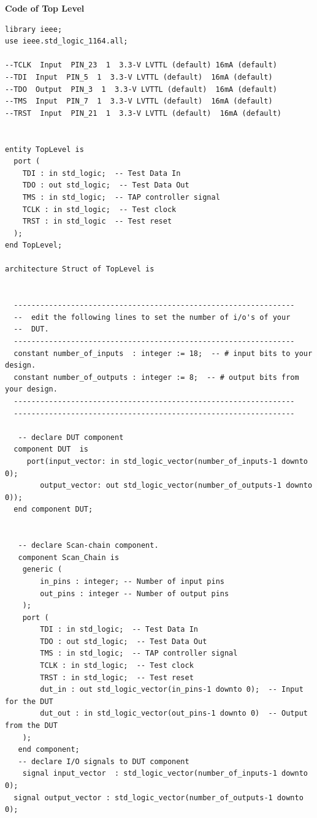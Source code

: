 \documentclass[12pt]{article}
\begin{document}
        \noindent
        \textbf{Code of Top Level}
        \noindent
        \begin{verbatim}
library ieee;
use ieee.std_logic_1164.all;

--TCLK  Input  PIN_23  1  3.3-V LVTTL (default) 16mA (default)		
--TDI  Input  PIN_5  1  3.3-V LVTTL (default)  16mA (default)		
--TDO  Output  PIN_3  1  3.3-V LVTTL (default)  16mA (default)		
--TMS  Input  PIN_7  1  3.3-V LVTTL (default)  16mA (default)		
--TRST  Input  PIN_21  1  3.3-V LVTTL (default)  16mA (default)		
								

entity TopLevel is
  port (
    TDI : in std_logic;  -- Test Data In
    TDO : out std_logic;  -- Test Data Out
    TMS : in std_logic;  -- TAP controller signal
    TCLK : in std_logic;  -- Test clock
    TRST : in std_logic  -- Test reset
  );
end TopLevel; 

architecture Struct of TopLevel is


  ----------------------------------------------------------------
  --  edit the following lines to set the number of i/o's of your
  --  DUT.
  ----------------------------------------------------------------
  constant number_of_inputs  : integer := 18;  -- # input bits to your design.
  constant number_of_outputs : integer := 8;  -- # output bits from your design.
  ----------------------------------------------------------------
  ----------------------------------------------------------------

   -- declare DUT component
  component DUT  is
     port(input_vector: in std_logic_vector(number_of_inputs-1 downto 0);
        output_vector: out std_logic_vector(number_of_outputs-1 downto 0));
  end component DUT;

  
   -- declare Scan-chain component.
   component Scan_Chain is
  	generic (
    	in_pins : integer; -- Number of input pins
    	out_pins : integer -- Number of output pins
  	);
  	port (
    	TDI : in std_logic;  -- Test Data In
    	TDO : out std_logic;  -- Test Data Out
    	TMS : in std_logic;  -- TAP controller signal
    	TCLK : in std_logic;  -- Test clock
    	TRST : in std_logic;  -- Test reset
    	dut_in : out std_logic_vector(in_pins-1 downto 0);  -- Input for the DUT
    	dut_out : in std_logic_vector(out_pins-1 downto 0)  -- Output from the DUT
  	);
   end component;
   -- declare I/O signals to DUT component
	signal input_vector  : std_logic_vector(number_of_inputs-1 downto 0);
  signal output_vector : std_logic_vector(number_of_outputs-1 downto 0);


\end{verbatim}
\end{document}

